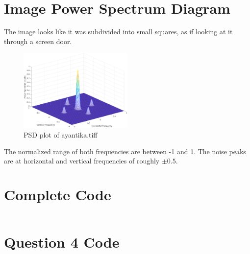 \documentclass{article}
\begin{document}
\section{Image Power Spectrum Diagram}

The image looks like it was subdivided into small squares, as if looking at it through a screen door.

\begin{figure}[H]
	\centering
	\includegraphics[width=0.5\textwidth]{ipsd}
	\caption{PSD plot of ayantika.tiff}
	\label{fig:psd2}
\end{figure}

The normalized range of both frequencies are between -1 and 1. The noise peaks are at horizontal and vertical frequencies of roughly \(\pm 0.5\).

\pagebreak
\appendix
\section{Complete Code}
\inputminted{Matlab}{Lab4.m}

\pagebreak
\section{Question 4 Code}
\inputminted{Matlab}{Q4.m}
\end{document}
